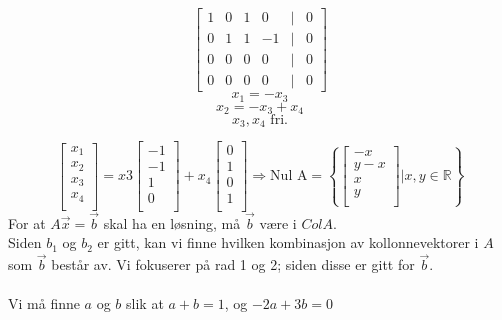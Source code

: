 \documentclass[12pt,norsk,a4paper]{article}
\begin{document}
\begin{equation*}
\begin{bmatrix}
1&0&1&0&|&0\\
0&1&1&-1&|&0\\
0&0&0&0&|&0\\
0&0&0&0&|&0
\end{bmatrix}
\end{equation*}
\[x_1 = -x_3\]
\[x_2 = -x_3 + x_4\]
\[x_3, x_4 \textrm{ fri.} \]

\begin{equation*}
\begin{bmatrix}
x_1\\ x_2\\ x_3\\ x_4\\
\end{bmatrix} 
= 
x3 
\begin{bmatrix}
-1\\ -1\\ 1\\ 0\\ 
\end{bmatrix} 
+ x_4
\begin{bmatrix}
0\\ 1\\ 0\\ 1\\ 
\end{bmatrix} 
\Rightarrow 
\textrm{Nul A} = 
\left\{{
\begin{bmatrix}
-x\\ y-x\\ x\\ y\\ 
\end{bmatrix} | x, y \in \mathbb{R}}\right\}
\end{equation*}
For at $A\vec{x} = \vec{b}$ skal ha en løsning, må $\vec{b} $ være i $Col A$.\\
Siden $b_1$ og $b_2$ er gitt, kan vi finne hvilken kombinasjon av kollonnevektorer i $A$ som $\vec{b} $ består av. Vi fokuserer på rad 1 og 2; siden disse er gitt for $\vec{b}$.\\
\\
Vi må finne $a$ og $b$ slik at $a + b = 1$, og $-2a + 3b = 0$
\end{document}
